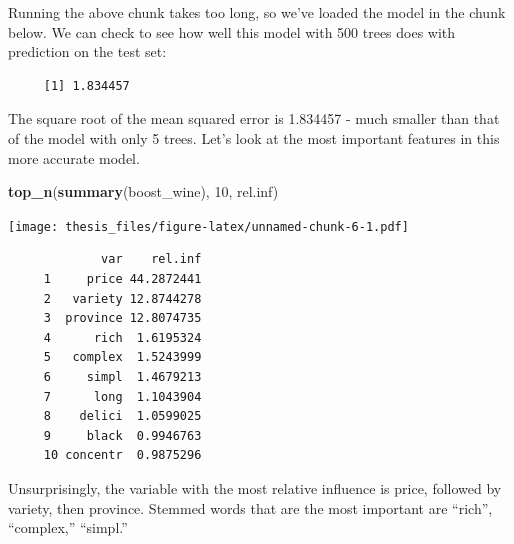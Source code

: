 \documentclass[12pt,twoside]{amherstthesis}
\newenvironment{Shaded}{\begin{snugshade}}{\end{snugshade}}
\newcommand{\KeywordTok}[1]{\textcolor[rgb]{0.13,0.29,0.53}{\textbf{#1}}}
\newcommand{\DataTypeTok}[1]{\textcolor[rgb]{0.13,0.29,0.53}{#1}}
\newcommand{\DecValTok}[1]{\textcolor[rgb]{0.00,0.00,0.81}{#1}}
\newcommand{\StringTok}[1]{\textcolor[rgb]{0.31,0.60,0.02}{#1}}
\newcommand{\CommentTok}[1]{\textcolor[rgb]{0.56,0.35,0.01}{\textit{#1}}}
\newcommand{\OtherTok}[1]{\textcolor[rgb]{0.56,0.35,0.01}{#1}}
\newcommand{\OperatorTok}[1]{\textcolor[rgb]{0.81,0.36,0.00}{\textbf{#1}}}
\newcommand{\NormalTok}[1]{#1}
\begin{document}
Running the above chunk takes too long, so we've loaded the model in the
chunk below. We can check to see how well this model with 500 trees does
with prediction on the test set:
\begin{Shaded}
\end{Shaded}
\begin{verbatim}
     [1] 1.834457
\end{verbatim}
The square root of the mean squared error is 1.834457 - much smaller
than that of the model with only 5 trees. Let's look at the most
important features in this more accurate model.
\begin{Shaded}
\begin{Highlighting}[]
\KeywordTok{top_n}\NormalTok{(}\KeywordTok{summary}\NormalTok{(boost_wine), }\DecValTok{10}\NormalTok{, rel.inf)}
\end{Highlighting}
\end{Shaded}
\texttt{[image: thesis\_files/figure-latex/unnamed-chunk-6-1.pdf]}
\begin{verbatim}
             var    rel.inf
     1     price 44.2872441
     2   variety 12.8744278
     3  province 12.8074735
     4      rich  1.6195324
     5   complex  1.5243999
     6     simpl  1.4679213
     7      long  1.1043904
     8    delici  1.0599025
     9     black  0.9946763
     10 concentr  0.9875296
\end{verbatim}
Unsurprisingly, the variable with the most relative influence is price,
followed by variety, then province. Stemmed words that are the most
important are ``rich'', ``complex,'' ``simpl.''
\end{document}
